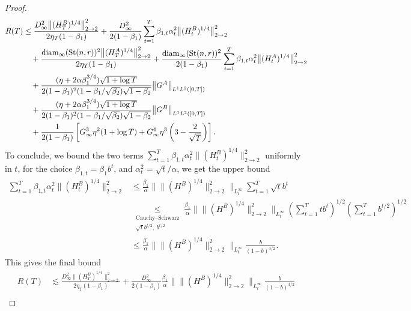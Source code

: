 \documentclass[11pt,a4paper]{article}
\numberwithin{equation}{section}
\newcommand{\Stnr}{\mathrm{St}(n,r)}    %
\theoremstyle{plain}
\theoremstyle{definition}
\theoremstyle{remark}
\begin{document}
\begin{proof}
    \begin{equation}\label{eq:bound_regret_reduced}
        \begin{split}
            R(T) &\leq \frac{D_{\infty}^2 \bigl\|(H_T^B)^{1/4}\bigr\|_{2\to 2}^2}{2\eta_T(1-\beta_1)} + \frac{D_{\infty}^2}{2(1-\beta_1)} \sum_{t=1}^T \beta_{1,t}\alpha_t^2 \bigl\|(H_t^B)^{1/4}\bigr\|_{2\to 2}^2 \\
            &\quad + \frac{\mathrm{diam}_{\infty}(\Stnr)^2 \bigl\|(H_T^A)^{1/4}\bigr\|_{2\to 2}^2}{2\eta_T(1-\beta_1)} + \frac{\mathrm{diam}_{\infty}(\Stnr)^2}{2(1-\beta_1)} \sum_{t=1}^T \beta_{1,t}\alpha_t^2 \bigl\|(H_t^A)^{1/4}\bigr\|_{2\to 2}^2 \\
            &\quad + \frac{(\eta+2\alpha\beta_1^{3/4})\sqrt{1+\log T}}{2(1-\beta_1)^2(1-\beta_1/\sqrt{\beta_2})\sqrt{1-\beta_2}} \bigl\|G^A\bigr\|_{L^1L^2([0,T])} \\
            &\quad + \frac{(\eta+2\alpha\beta_1^{3/4})\sqrt{1+\log T}}{2(1-\beta_1)^2(1-\beta_1/\sqrt{\beta_2})\sqrt{1-\beta_2}} \bigl\|G^B\bigr\|_{L^1L^2([0,T])} \\
            &\quad + \frac{1}{2(1-\beta_1)} \left[ G_\infty^3 \eta^2 (1+\log T) + G_\infty^4 \eta^3 \left(3-\frac{2}{\sqrt{T}}\right) \right].
        \end{split}
        \raisetag{3\baselineskip}
    \end{equation}
    To conclude, we bound the two terms $\sum_{t=1}^T \beta_{1,t} \alpha_t^2 \|(H_t^B)^{1/4}\|_{2\to 2}^2$ uniformly in $t$, for the choice $\beta_{1,t} = \beta_1 b^t$, and $\alpha_t^2 = \sqrt{t}/{\alpha}$, we get the upper bound
    \begin{align*}
        \sum_{t=1}^T \beta_{1,t} \alpha_t^2 \|(H_t^B)^{1/4}\|_{2\to 2}^2 &\leq \frac{\beta_1}{\alpha}\| \| (H^B)^{1/4}\|_{2 \to 2}^2 \|_{L^\infty_t} \sum_{t=1}^T \sqrt{t} b^t \\
        &\underset{\substack{\text{Cauchy--Schwarz} \\ \sqrt{t}b^{t/2},~b^{t/2}}}{\leq} \frac{\beta_1}{\alpha}\| \| (H^B)^{1/4}\|_{2 \to 2}^2 \|_{L^\infty_t} \left(\sum_{t=1}^T t b^t\right)^{1/2} \left(\sum_{t=1}^T b^{t/2}\right)^{1/2} \\
        &\leq \frac{\beta_1}{\alpha}\| \| (H^B)^{1/4}\|_{2 \to 2}^2 \|_{L^\infty_t} \frac{b}{ (1-b)^{3/2}}.
    \end{align*}
    This gives the final bound
    \begin{equation*}
        \begin{aligned}
            R(T) &\lesssim \frac{D_{\infty}^2 \|(H_T^B)^{1/4} \|_{2 \to 2}^2}{2\eta_T(1-\beta_1)} + \frac{D_{\infty}^2}{2(1-\beta_1)}\frac{\beta_1}{\alpha}\| \| (H^B)^{1/4}\|_{2 \to 2}^2 \|_{L^\infty_t}\frac{b}{(1-b)^{3/2}} \\

\end{aligned}
\end{equation*}
\end{proof}
\end{document}
